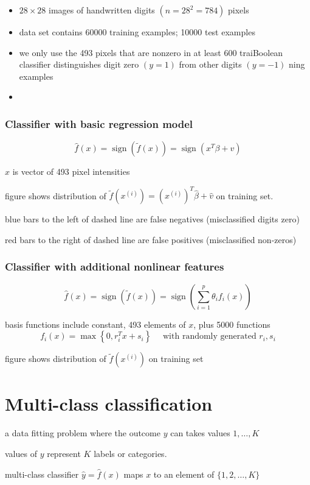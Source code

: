 \begin{itemize}
    \item $ 28 \times 28 $ images of handwritten digits $ \left(n=28^{2}=784\right) $ pixels
    \item data set contains 60000 training examples; 10000 test examples
    \item we only use the 493 pixels that are nonzero in at least 600 traiBoolean classifier distinguishes digit zero $ (y=1) $ from other digits $ (y=-1) $
ning examples
    \item 
\end{itemize}


\subsubsection{Classifier with basic regression model}

$$
\hat{f}(x)=\operatorname{sign}(\tilde{f}(x))=\operatorname{sign}\left(x^{T} \beta+v\right)
$$

$ x $ is vector of 493 pixel intensities

figure shows distribution of $ \tilde{f}\left(x^{(i)}\right)=\left(x^{(i)}\right)^{T} \hat{\beta}+\hat{v} $ on training set.

blue bars to the left of dashed line are false negatives (misclassified digits zero)

red bars to the right of dashed line are false positives (misclassified non-zeros)

\subsubsection{Classifier with additional nonlinear features}

$$
\hat{f}(x)=\operatorname{sign}(\tilde{f}(x))=\operatorname{sign}\left(\sum_{i=1}^{p} \theta_{i} f_{i}(x)\right)
$$

basis functions include constant, 493 elements of $ x $, plus 5000 functions
$$
f_{i}(x)=\max \left\{0, r_{i}^{T} x+s_{i}\right\} \quad \text { with randomly generated } r_{i}, s_{i}
$$

figure shows distribution of $ \tilde{f}\left(x^{(i)}\right) $ on training set

\section{Multi-class classification}

\begin{problem}
    a data fitting problem where the outcome $ y $ can takes values $ 1, \ldots, K $

    values of $ y $ represent $ K $ labels or categories.

    multi-class classifier $ \hat{y}=\hat{f}(x) $ maps $ x $ to an element of $ \{1,2, \ldots, K\} $
\end{problem}

